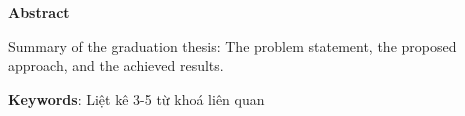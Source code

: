 \begin{center}
\textbf{\large{Abstract}	}
\end{center}

\begin{small}

Summary of the graduation thesis: The problem statement, the proposed approach, and the achieved results.


\vspace*{1cm}
\textbf{Keywords}: Liệt kê 3-5 từ khoá liên quan
\end{small}